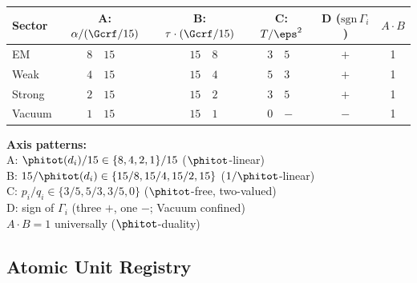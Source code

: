 \documentclass[12pt, a4paper]{article}
\begin{document}
\begin{derivedbox}[title={Complete Four-Axis Sector Table}]
{\small
\renewcommand{\arraystretch}{1.4}
\begin{center}
\begin{tabular}{l
    r@{/}l
    r@{/}l
    r@{/}l
    c
    c}
\toprule
\textbf{Sector}
  & \multicolumn{2}{c}{\textbf{A}: $\alpha/(\Gcrf/15)$}
  & \multicolumn{2}{c}{\textbf{B}: $\tau\cdot(\Gcrf/15)$}
  & \multicolumn{2}{c}{\textbf{C}: $T/\eps^2$}
  & \textbf{D} ($\text{sgn}\,\Gamma_i$)
  & $A\!\cdot\! B$ \\
\midrule
EM     & $8$ & $15$ & $15$ & $8$  & $3$ & $5$ & $+$ & 1 \\
Weak   & $4$ & $15$ & $15$ & $4$  & $5$ & $3$ & $+$ & 1 \\
Strong & $2$ & $15$ & $15$ & $2$  & $3$ & $5$ & $+$ & 1 \\
Vacuum & $1$ & $15$ & $15$ & $1$  & $0$ & $-$ & $-$ & 1 \\
\bottomrule
\end{tabular}
\end{center}
}

\medskip
\textbf{Axis patterns:}\\
A: $\phitot(d_i)/15 \in \{8,4,2,1\}/15$ \quad($\phitot$-linear)\\
B: $15/\phitot(d_i) \in \{15/8,15/4,15/2,15\}$ \quad($1/\phitot$-linear)\\
C: $p_i/q_i \in \{3/5, 5/3, 3/5, 0\}$ \quad($\phitot$-free, two-valued)\\
D: sign of $\Gamma_i$ \quad(three $+$, one $-$; Vacuum confined)\\
$A\cdot B = 1$ universally \quad($\phitot$-duality)
\end{derivedbox}

\subsection{Atomic Unit Registry}
\label{sec:registry}
\end{document}
